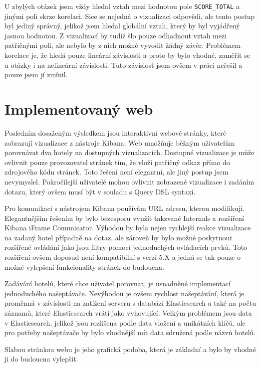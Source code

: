 \documentclass[czech,BP]{thesiskiv}
\begin{document}
U zbylých otázek jsem vždy hledal vztah mezi hodnotou pole \texttt{SCO\-RE\_TO\-TAL} a jinými poli skrze  korelaci. Sice se nejedná o vizualizaci odpovědi, ale tento postup byl jediný správný, jelikož jsem hledal globální vztah, který by byl vyjádřený jasnou hodnotou. Z vizualizací by tudíž šlo pouze odhadnout vztah mezi patřičnými poli, ale nebylo by z nich možné vyvodit žádný závěr. Problémem korelace je, že hledá pouze lineární závislosti a proto by bylo vhodné, zaměřit se u otázky  i na nelineární závislosti. Tuto závislost jsem ovšem v práci neřešil a pouze jsem jí zmínil.

\section{Implementovaný web}
Posledním dosaženým výsledkem jsou interaktivní webové stránky, které zobrazují vizualizace z nástroje Kibana. Web umožňuje běžným uživatelům porovnávat dva hotely na dostupných vizualizacích. Dostupné vizualizace je může ovlivnit pouze provozovatel stránek tím, že vloží patřičný odkaz přímo do zdrojového kódu stránek. Toto řešení není elegantní, ale jiný postup jsem nevymyslel. Pokročilejší uživatelé mohou ovlivnit zobrazené vizualizace i zadáním dotazu, který ovšem musí být v souladu s Query DSL syntaxí.


Pro komunikaci s nástrojem Kibana používám URL adresu, kterou modifikuji. Elegantnějším řešením by bylo bezesporu využít takzvané Internals a rozšíření Kibana iFrame Comunicator. Výhodou by byla nejen rychlejší reakce vizualizace na zadaný hotel případně na dotaz, ale zároveň by bylo možné poskytnout rozšířené ovládání jako jsou filtry pomocí jednoduchých ovládacích prvků. Toto rozšíření ovšem doposud není kompatibilní s verzí 5.X a jedná se tak pouze o možné vylepšení funkcionality stránek do budoucna.


Zadávání hotelů, které chce uživatel porovnat, je usnadněné implementací jednoduchého našeptávače. Nevýhodou je ovšem rychlost našeptávání, která je proměnná v závislosti na zatížení serveru s databází Elasticsearch a také na počtu záznamů, které Elasticsearch vrátí jako vyhovující. Velkým problémem jsou data v Elasticsearch, jelikož jsou rozlišena podle data vložení a unikátních klíčů, ale pro potřeby našeptávače by bylo vhodnější mít data sdružená podle názvů hotelů.


Slabou stránkou webu je jeho grafická podoba, která je základní a  bylo by vhodné ji do budoucna vylepšit.
\end{document}

